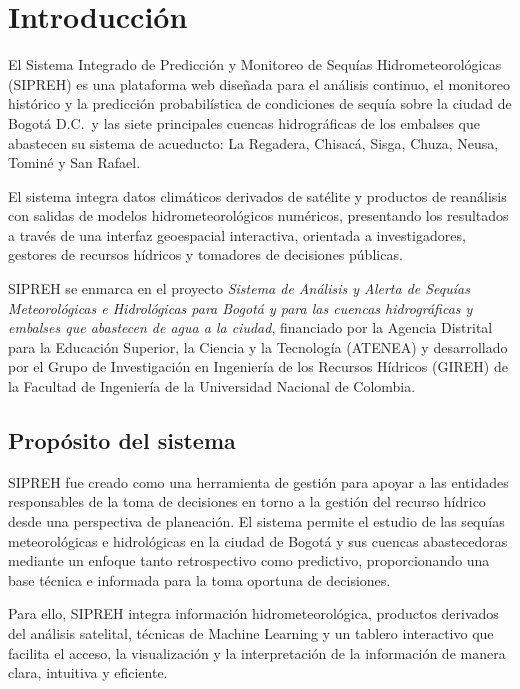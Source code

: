 \chapter{Introducción}
\label{ch:introduccion}

El Sistema Integrado de Predicción y Monitoreo de Sequías Hidrometeorológicas (SIPREH) es una plataforma web diseñada para el análisis continuo, el monitoreo histórico y la predicción probabilística de condiciones de sequía sobre la ciudad de Bogotá D.C.\ y las siete principales cuencas hidrográficas de los embalses que abastecen su sistema de acueducto: La Regadera, Chisacá, Sisga, Chuza, Neusa, Tominé y San Rafael.

El sistema integra datos climáticos derivados de satélite y productos de reanálisis con salidas de modelos hidrometeorológicos numéricos, presentando los resultados a través de una interfaz geoespacial interactiva, orientada a investigadores, gestores de recursos hídricos y tomadores de decisiones públicas.

SIPREH se enmarca en el proyecto \textit{Sistema de Análisis y Alerta de Sequías Meteorológicas e Hidrológicas para Bogotá y para las cuencas hidrográficas y embalses que abastecen de agua a la ciudad}, financiado por la Agencia Distrital para la Educación Superior, la Ciencia y la Tecnología (ATENEA) y desarrollado por el Grupo de Investigación en Ingeniería de los Recursos Hídricos (GIREH) de la Facultad de Ingeniería de la Universidad Nacional de Colombia.

\section{Propósito del sistema}
\label{sec:proposito}

SIPREH fue creado como una herramienta de gestión para apoyar a las entidades responsables de la toma de decisiones en torno a la gestión del recurso hídrico desde una perspectiva de planeación. El sistema permite el estudio de las sequías meteorológicas e hidrológicas en la ciudad de Bogotá y sus cuencas abastecedoras mediante un enfoque tanto retrospectivo como predictivo, proporcionando una base técnica e informada para la toma oportuna de decisiones.

Para ello, SIPREH integra información hidrometeorológica, productos derivados del análisis satelital, técnicas de Machine Learning y un tablero interactivo que facilita el acceso, la visualización y la interpretación de la información de manera clara, intuitiva y eficiente.

